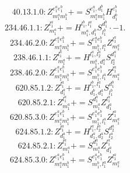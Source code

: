 \documentclass[letterpaper,10pt,fleqn,leqno,onecolumn]{article}
\begin{document}
\begin{equation} \;\;\;\;\;\;  40.13.1.0: Z^{e_{1}^{a}e_{1}^{b}}_{m_{1}^{a}m_{1}^{b}}+=S^{e_{1}^{a},d_{1}^{b}}_{m_{1}^{a}m_{1}^{b}}H^{e_{1}^{b}}_{d_{1}^{b}} \end{equation}
\begin{equation} \;\;\;\;\;\;  234.46.1.1: Z^{l_{1}^{a}}_{m_{1}^{a}}+=H^{l_{1}^{b},l_{1}^{a}}_{m_{1}^{a},d_{1}^{b}}S^{d_{1}^{b}}_{l_{1}^{b}}\cdot -1. \end{equation}
\begin{equation} \;\;\;\;\;\;  234.46.2.0: Z^{e_{1}^{a}e_{1}^{b}}_{m_{1}^{a}m_{1}^{b}}+=S^{e_{1}^{a}e_{1}^{b}}_{m_{1}^{b},l_{1}^{a}}Z^{l_{1}^{a}}_{m_{1}^{a}} \end{equation}
\begin{equation} \;\;\;\;\;\;  238.46.1.1: Z^{l_{1}^{a}}_{m_{1}^{a}}+=H^{l_{1}^{a},l_{2}^{a}}_{m_{1}^{a},d_{1}^{a}}S^{d_{1}^{a}}_{l_{2}^{a}} \end{equation}
\begin{equation} \;\;\;\;\;\;  238.46.2.0: Z^{e_{1}^{a}e_{1}^{b}}_{m_{1}^{a}m_{1}^{b}}+=S^{e_{1}^{a}e_{1}^{b}}_{m_{1}^{b},l_{1}^{a}}Z^{l_{1}^{a}}_{m_{1}^{a}} \end{equation}
\begin{equation} \;\;\;\;\;\;  620.85.1.2: Z^{l_{1}^{a}}_{d_{1}^{a}}+=H^{l_{1}^{b},l_{1}^{a}}_{d_{1}^{b},d_{1}^{a}}S^{d_{1}^{b}}_{l_{1}^{b}} \end{equation}
\begin{equation} \;\;\;\;\;\;  620.85.2.1: Z^{l_{1}^{a}}_{m_{1}^{a}}+=S^{d_{1}^{a}}_{m_{1}^{a}}Z^{l_{1}^{a}}_{d_{1}^{a}} \end{equation}
\begin{equation} \;\;\;\;\;\;  620.85.3.0: Z^{e_{1}^{a}e_{1}^{b}}_{m_{1}^{a}m_{1}^{b}}+=S^{e_{1}^{a}e_{1}^{b}}_{m_{1}^{b},l_{1}^{a}}Z^{l_{1}^{a}}_{m_{1}^{a}} \end{equation}
\begin{equation} \;\;\;\;\;\;  624.85.1.2: Z^{l_{1}^{a}}_{d_{1}^{a}}+=H^{l_{1}^{a},l_{2}^{a}}_{d_{1}^{a},d_{2}^{a}}S^{d_{2}^{a}}_{l_{2}^{a}} \end{equation}
\begin{equation} \;\;\;\;\;\;  624.85.2.1: Z^{l_{1}^{a}}_{m_{1}^{a}}+=S^{d_{1}^{a}}_{m_{1}^{a}}Z^{l_{1}^{a}}_{d_{1}^{a}} \end{equation}
\begin{equation} \;\;\;\;\;\;  624.85.3.0: Z^{e_{1}^{a}e_{1}^{b}}_{m_{1}^{a}m_{1}^{b}}+=S^{e_{1}^{a}e_{1}^{b}}_{m_{1}^{b},l_{1}^{a}}Z^{l_{1}^{a}}_{m_{1}^{a}} \end{equation}
\end{document}
